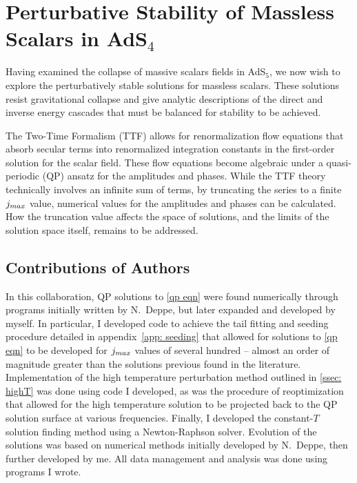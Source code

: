 \documentclass[../PhD.tex]{subfiles}
\begin{document}

\chapter{Perturbative Stability of Massless Scalars in AdS$_4$}
\label{ch: ttf}

Having examined the collapse of massive scalars fields in AdS$_5$, we now wish to explore the perturbatively stable solutions for massless scalars. These solutions resist gravitational collapse and give analytic descriptions of the direct and inverse energy cascades that must be balanced for stability to be achieved. 

The Two-Time Formalism (TTF) allows for renormalization flow equations that absorb secular terms into renormalized integration constants in the first-order solution for the scalar field. These flow equations become algebraic under a quasi-periodic (QP) ansatz for the amplitudes and phases. While the TTF theory technically involves an infinite sum of terms, by truncating the series to a finite $j_{max}$ value, numerical values for the amplitudes and phases can be calculated. How the truncation value affects the space of solutions, and the limits of the solution space itself, remains to be addressed.

\section{Contributions of Authors}

In this collaboration, QP solutions to \eqref{qp eqn} were found numerically through programs initially written by N.~Deppe, but later expanded and developed by myself. In particular, I developed code to achieve the tail fitting and seeding procedure detailed in appendix~\ref{app: seeding} that allowed for solutions to \eqref{qp eqn} to be developed for $j_{max}$ values of several hundred -- almost an order of magnitude greater than the solutions previous found in the literature. Implementation of the high temperature perturbation method outlined in \ref{ssec: highT} was done using code I developed, as was the procedure of reoptimization that allowed for the high temperature solution to be projected back to the QP solution surface at various frequencies. Finally, I developed the constant-$T$ solution finding method using a Newton-Raphson solver. Evolution of the solutions was based on numerical methods initially developed by N.~Deppe, then further developed by me. All data management and analysis was done using programs I wrote.
\end{document}
